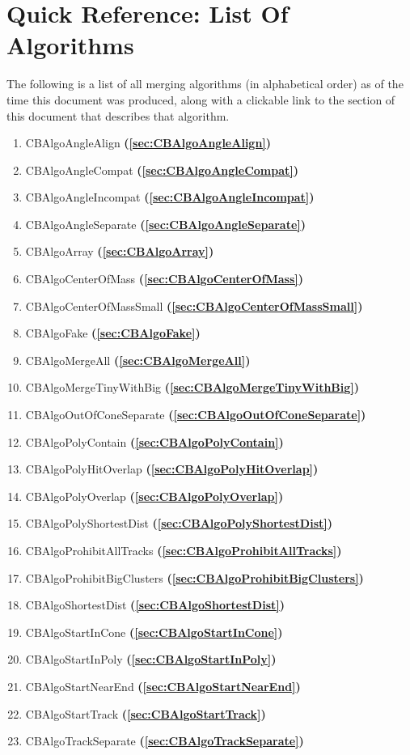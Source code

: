 \documentclass{article}
\begin{document}
\section{Quick Reference: List Of Algorithms}
The following is a list of all merging algorithms (in alphabetical order) as of the time this document was produced, along with a clickable link to the section of this document that describes that algorithm.
\begin{enumerate}
\item CBAlgoAngleAlign \textbf{(\autoref{sec:CBAlgoAngleAlign})}
\item CBAlgoAngleCompat \textbf{(\autoref{sec:CBAlgoAngleCompat})}
\item CBAlgoAngleIncompat \textbf{(\autoref{sec:CBAlgoAngleIncompat})}
\item CBAlgoAngleSeparate \textbf{(\autoref{sec:CBAlgoAngleSeparate})}
\item CBAlgoArray \textbf{(\autoref{sec:CBAlgoArray})}
\item CBAlgoCenterOfMass \textbf{(\autoref{sec:CBAlgoCenterOfMass})}
\item CBAlgoCenterOfMassSmall \textbf{(\autoref{sec:CBAlgoCenterOfMassSmall})}
\item CBAlgoFake \textbf{(\autoref{sec:CBAlgoFake})}
\item CBAlgoMergeAll \textbf{(\autoref{sec:CBAlgoMergeAll})}
\item CBAlgoMergeTinyWithBig \textbf{(\autoref{sec:CBAlgoMergeTinyWithBig})}
\item CBAlgoOutOfConeSeparate \textbf{(\autoref{sec:CBAlgoOutOfConeSeparate})}
\item CBAlgoPolyContain \textbf{(\autoref{sec:CBAlgoPolyContain})}
\item CBAlgoPolyHitOverlap \textbf{(\autoref{sec:CBAlgoPolyHitOverlap})}
\item CBAlgoPolyOverlap \textbf{(\autoref{sec:CBAlgoPolyOverlap})}
\item CBAlgoPolyShortestDist \textbf{(\autoref{sec:CBAlgoPolyShortestDist})}
\item CBAlgoProhibitAllTracks \textbf{(\autoref{sec:CBAlgoProhibitAllTracks})}
\item CBAlgoProhibitBigClusters \textbf{(\autoref{sec:CBAlgoProhibitBigClusters})}
\item CBAlgoShortestDist \textbf{(\autoref{sec:CBAlgoShortestDist})}
\item CBAlgoStartInCone \textbf{(\autoref{sec:CBAlgoStartInCone})}
\item CBAlgoStartInPoly \textbf{(\autoref{sec:CBAlgoStartInPoly})}
\item CBAlgoStartNearEnd \textbf{(\autoref{sec:CBAlgoStartNearEnd})}
\item CBAlgoStartTrack \textbf{(\autoref{sec:CBAlgoStartTrack})}
\item CBAlgoTrackSeparate \textbf{(\autoref{sec:CBAlgoTrackSeparate})}
\end{enumerate}
\end{document}
